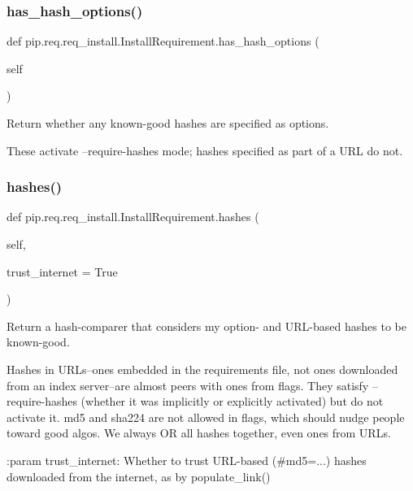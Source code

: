 \subsubsection{\texorpdfstring{has\+\_\+hash\+\_\+options()}{has\_hash\_options()}}
{\footnotesize\ttfamily def pip.\+req.\+req\+\_\+install.\+Install\+Requirement.\+has\+\_\+hash\+\_\+options (\begin{DoxyParamCaption}\item[{}]{self }\end{DoxyParamCaption})}

\begin{DoxyVerb}Return whether any known-good hashes are specified as options.

These activate --require-hashes mode; hashes specified as part of a
URL do not.\end{DoxyVerb}
 \mbox{\label{classpip_1_1req_1_1req__install_1_1_install_requirement_a33e3b906ae6bf8954c90b79beb53efc0}} 
\subsubsection{\texorpdfstring{hashes()}{hashes()}}
{\footnotesize\ttfamily def pip.\+req.\+req\+\_\+install.\+Install\+Requirement.\+hashes (\begin{DoxyParamCaption}\item[{}]{self,  }\item[{}]{trust\+\_\+internet = {\ttfamily True} }\end{DoxyParamCaption})}

\begin{DoxyVerb}Return a hash-comparer that considers my option- and URL-based
hashes to be known-good.

Hashes in URLs--ones embedded in the requirements file, not ones
downloaded from an index server--are almost peers with ones from
flags. They satisfy --require-hashes (whether it was implicitly or
explicitly activated) but do not activate it. md5 and sha224 are not
allowed in flags, which should nudge people toward good algos. We
always OR all hashes together, even ones from URLs.

:param trust_internet: Whether to trust URL-based (#md5=...) hashes
    downloaded from the internet, as by populate_link()\end{DoxyVerb}
 \mbox{\label{classpip_1_1req_1_1req__install_1_1_install_requirement_ad27ff0b16cd59e0336bb56e7c7b0137e}} 
